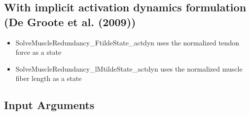\documentclass[a4paper,oneside,11pt]{article}
\begin{document}
\subsection{With implicit activation dynamics formulation (De Groote et al. (2009))}

\begin{itemize}
\item SolveMuscleRedundancy_FtildeState_actdyn uses the normalized tendon force as a state
\item SolveMuscleRedundancy_lMtildeState_actdyn uses the normalized muscle fiber length as a state
\end{itemize}


\subsection{Input Arguments}
\end{document}
